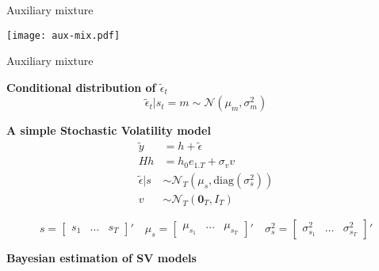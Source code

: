 \documentclass[notes,blackandwhite,mathsans,usenames,dvipsnames]{beamer}
\begin{document}
\begin{frame}{Auxiliary mixture}

\centering
\texttt{[image: aux-mix.pdf]}
\end{frame}






\begin{frame}{Auxiliary mixture}

\bigskip\textbf{Conditional distribution of $\tilde{\epsilon}_t$}
$$
\tilde{\epsilon}_t|s_t=m \sim\mathcal{N}\left( \mu_{m}, \sigma^2_{m} \right)
$$

\bigskip\textbf{A simple Stochastic Volatility model}
\begin{align}
\tilde{y} &= h + \tilde{\epsilon} \\[1ex]
Hh &= h_0 e_{1.T} + \sigma_v v \\[1ex]
\tilde{\epsilon}|s &\sim \mathcal{N}_T\left( \mu_s, \text{diag}\left(\sigma_s^2\right) \right)\\[1ex]
v &\sim\mathcal{N}_T\left( \mathbf{0}_T, I_T \right)
\end{align}

\small
$$
s = \begin{bmatrix} s_1& \dots & s_T \end{bmatrix}'\quad
\mu_s = \begin{bmatrix} \mu_{s_1}& \dots & \mu_{s_T} \end{bmatrix}'\quad
\sigma_s^2 = \begin{bmatrix} \sigma^2_{s_1}& \dots & \sigma^2_{s_T} \end{bmatrix}'
$$

\end{frame}




{
\begin{frame}

\begin{adjustwidth}{-0.5cm}{0cm}
\FlushLeft
\vspace{8.3cm}\Large
\textbf{{\color{mcxs2}Bayesian estimation} {\color{mcxs5}of SV models}}
\end{adjustwidth}

\end{frame}
}
\end{document}
